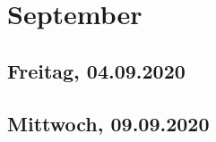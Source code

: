 \documentclass[../main.tex]{subfiles}
\begin{document}
	\section{September}
	
	\subsection{Freitag, 04.09.2020}
	
	\subsection{Mittwoch, 09.09.2020}
\end{document}

